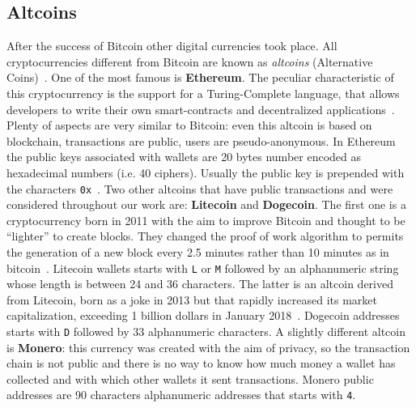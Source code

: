 \subsection{Altcoins}
After the success of Bitcoin other digital currencies took place.
All cryptocurrencies different from Bitcoin are known as 
\emph{altcoins} (Alternative Coins)~\cite{bib:bitcoinbeyond}.
One of the most famous is
\textbf{Ethereum}. The peculiar characteristic of this cryptocurrency is
the support for a Turing-Complete language, that allows developers to
write their own smart-contracts and decentralized
applications~\cite{bib:ethereum:whitepaper}.
Plenty of aspects are very similar to Bitcoin: even
this altcoin is based on blockchain, transactions are public, users are
pseudo-anonymous. In Ethereum the public keys associated with wallets are 20
bytes number encoded as hexadecimal numbers (i.e. 40 ciphers). Usually
the public key is prepended with the characters
\texttt{0x}~\cite{bib:ethereum:whitepaper}.
Two other altcoins that have public transactions and were considered
throughout our work are: \textbf{Litecoin} and \textbf{Dogecoin}.
The first one is a cryptocurrency born in 2011 with the aim to improve
Bitcoin and thought to be ``lighter'' to create blocks.
They changed the proof of work algorithm to permits the
generation of a new block every 2.5 minutes rather than 10 minutes as in
bitcoin~\cite{bib:litecoin:wiki}.
Litecoin wallets starts with \texttt{L} or \texttt{M} followed by an
alphanumeric string whose length is between 24 and 36 characters.
The latter is an altcoin derived from Litecoin, born as a joke in 2013
but that rapidly increased its market capitalization, exceeding 1
billion dollars in January 2018~\cite{}. Dogecoin addresses
starts with \texttt{D} followed by 33 alphanumeric characters.
A slightly different altcoin is \textbf{Monero}: this currency was
created with the aim of privacy, so the transaction chain is not public
and there is no way to know how much money a wallet has collected and
with which other wallets it sent transactions.
Monero public addresses are 90 characters alphanumeric addresses that starts with \texttt{4}.


